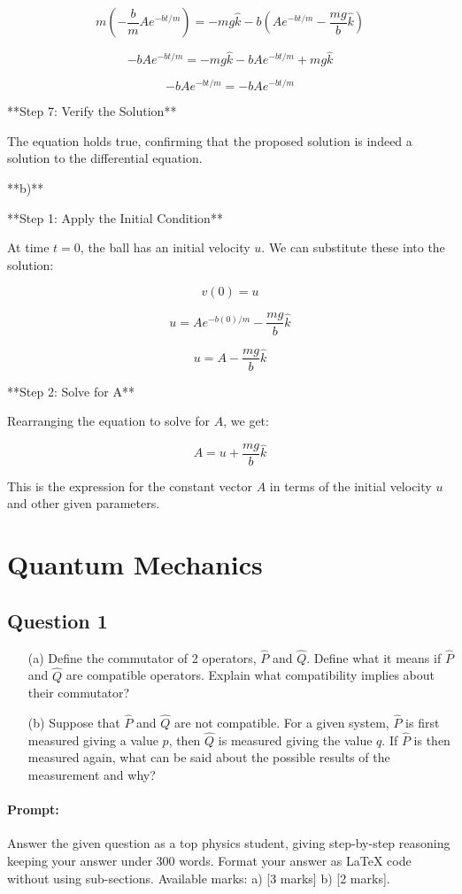 \documentclass{article}
\begin{document}
$$m\left(-\frac{b}{m}Ae^{-bt/m}\right) = -mg\hat{k} - b\left(Ae^{-bt/m} - \frac{mg}{b}\hat{k}\right)$$

$$-bAe^{-bt/m} = -mg\hat{k} - bAe^{-bt/m} + mg\hat{k}$$

$$-bAe^{-bt/m} = -bAe^{-bt/m}$$

**Step 7: Verify the Solution**

The equation holds true, confirming that the proposed solution is indeed a solution to the differential equation.

**b)**

**Step 1: Apply the Initial Condition**

At time $t=0$, the ball has an initial velocity $u$. We can substitute these into the solution:

$$v(0) = u$$

$$u = Ae^{-b(0)/m} - \frac{mg}{b}\hat{k}$$

$$u = A - \frac{mg}{b}\hat{k}$$

**Step 2: Solve for A**

Rearranging the equation to solve for $A$, we get:

$$A = u + \frac{mg}{b}\hat{k}$$

This is the expression for the constant vector $A$ in terms of the initial velocity $u$ and other given parameters.

\section{Quantum Mechanics}

\subsection{Question 1}
\begin{enumerate}
    \item[(a)] Define the commutator of 2 operators, $\hat{P}$ and $\hat{Q}$. Define what it means if $\hat{P}$ and $\hat{Q}$ are compatible operators. Explain what compatibility implies about their commutator?
    \item[(b)] Suppose that $\hat{P}$ and $\hat{Q}$ are not compatible. For a given system, $\hat{P}$ is first measured giving a value $p$, then $\hat{Q}$ is measured giving the value $q$. If $\hat{P}$ is then measured again, what can be said about the possible results of the measurement and why?
\end{enumerate}

\paragraph{Prompt: \\} 
Answer the given question as a top physics student, giving step-by-step reasoning keeping your answer under 300 words. Format your answer as LaTeX code without using sub-sections. Available marks: a) [3 marks] b) [2 marks].
\end{document}
